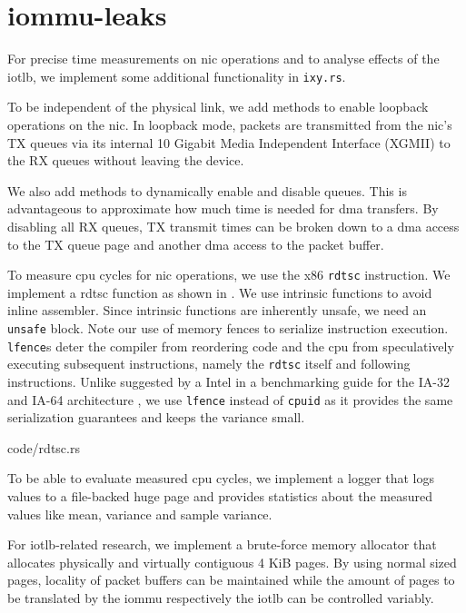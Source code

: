 \section{iommu-leaks}
\label{sec:iommu_leaks}

For precise time measurements on \ac{nic} operations and to analyse effects of
the \ac{iotlb}, we implement some additional functionality in \texttt{ixy.rs}.

To be independent of the physical link, we add methods to enable loopback
operations on the \ac{nic}. In loopback mode, packets are transmitted from the
\ac{nic}'s TX queues via its internal 10 Gigabit Media Independent Interface
(XGMII) to the RX queues without leaving the device.

We also add methods to dynamically enable and disable queues. This is
advantageous to approximate how much time is needed for \ac{dma} transfers. By
disabling all RX queues, TX transmit times can be broken down to a \ac{dma}
access to the TX queue page and another \ac{dma} access to the packet buffer.

To measure \ac{cpu} cycles for \ac{nic} operations, we use the x86
\texttt{rdtsc} instruction. We implement a rdtsc function as shown in
. We use intrinsic functions to avoid inline assembler. Since
intrinsic functions are inherently unsafe, we need an \texttt{unsafe} block.
Note our use of memory fences to serialize instruction execution.
\texttt{lfence}s deter the compiler from reordering code and the \ac{cpu} from
speculatively executing subsequent instructions, namely the \texttt{rdtsc}
itself and following instructions. Unlike suggested by a Intel in a benchmarking
guide for the IA-32 and IA-64 architecture \cite{paoloni2010benchmark}, we use
\texttt{lfence} instead of \texttt{cpuid} as it provides the same serialization
guarantees and keeps the variance small.

\begin{minipage}{\textwidth}
    
        {code/rdtsc.rs}
\end{minipage}

To be able to evaluate measured \ac{cpu} cycles, we implement a logger that logs
values to a file-backed huge page and provides statistics about the measured
values like mean, variance and sample variance.

For \ac{iotlb}-related research, we implement a brute-force memory allocator
that allocates physically and virtually contiguous 4 KiB pages. By using normal
sized pages, locality of packet buffers can be maintained while the amount of
pages to be translated by the \ac{iommu} respectively the \ac{iotlb} can be
controlled variably.

